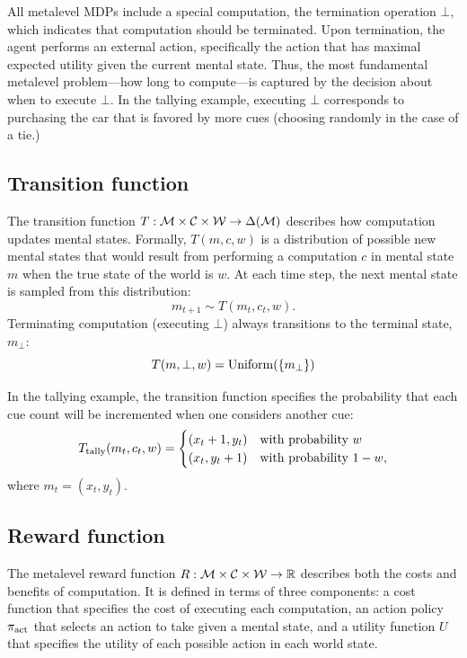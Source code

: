 All metalevel MDPs include a special computation, the termination operation $\bot$, which indicates that computation should be terminated. Upon termination, the agent performs an external action, specifically the action that has maximal expected utility given the current mental state. Thus, the most fundamental metalevel problem---how long to compute---is captured by the decision about when to execute $\bot$. In the tallying example, executing $\bot$ corresponds to purchasing the car that is favored by more cues (choosing randomly in the case of a tie.)

\subsection{Transition function}
The transition function $T: \mathcal{M} \times \mathcal{C} \times \mathcal{W} \rightarrow \Delta(\mathcal{M})$ describes how computation updates mental states. Formally, $T(m, c, w)$ is a distribution of possible new mental states that would result from performing a computation $c$ in mental state $m$ when the true state of the world is $w$. At each time step, the next mental state is sampled from this distribution:
\begin{equation}\label{eq:transition}
m_{t+1} \sim T(m_t, c_t, w).
\end{equation}
Terminating computation (executing $\bot$) always transitions to the terminal state, $m_\bot$:
%
\begin{equation}
  T(m, \bot, w) = \mathrm{Uniform}(\{m_\bot\})
\end{equation}

In the tallying example, the transition function specifies the probability that each cue count will be incremented when one considers another cue:
\begin{equation}\label{eq:tally-transition}
  T_{\text{tally}}(m_t, c_t, w) = \begin{cases}
    (x_t + 1, y_t) &\text{with probability } w  \\
    (x_t, y_t + 1) &\text{with probability } 1-w,
  \end{cases}
\end{equation}
where $m_t = (x_t, y_t)$.

\subsection{Reward function}
The metalevel reward function $R: \mathcal{M} \times \mathcal{C} \times \mathcal{W} \rightarrow \mathbb{R}$ describes both the costs and benefits of computation. It is defined in terms of three components: a cost function that specifies the cost of executing each computation, an action policy $\pi_{\text{act}}$ that selects an action to take given a mental state, and a utility function $U$ that specifies the utility of each possible action in each world state.

